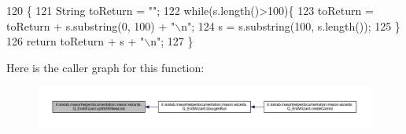 \begin{DoxyCode}
120                                               \{
121         String toReturn = \textcolor{stringliteral}{""};
122         \textcolor{keywordflow}{while}(s.length()>100)\{
123             toReturn = toReturn + s.substring(0, 100) + \textcolor{stringliteral}{"\(\backslash\)n"};
124             s = s.substring(100, s.length());
125         \}
126         \textcolor{keywordflow}{return} toReturn + s + \textcolor{stringliteral}{"\(\backslash\)n"};
127     \}
\end{DoxyCode}


Here is the caller graph for this function\-:
\nopagebreak
\begin{figure}[H]
\begin{center}
\leavevmode
\includegraphics[width=350pt]{classit_1_1isislab_1_1masonhelperdocumentation_1_1mason_1_1wizards_1_1_q___end_wizard_a1cdec1efdad895973386d4679b790a1c_icgraph}
\end{center}
\end{figure}




